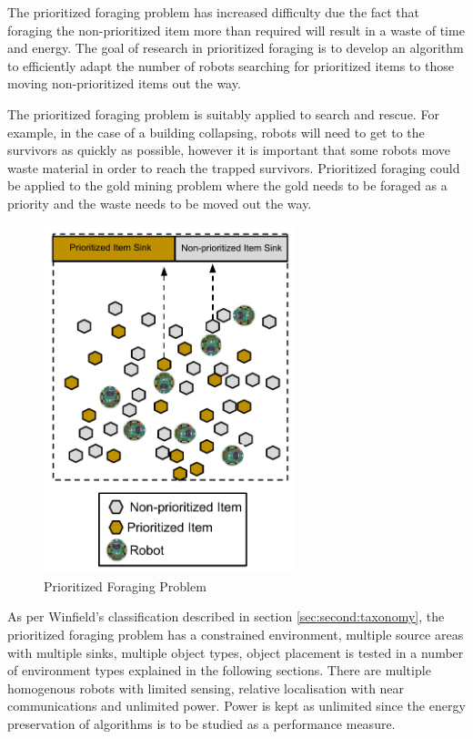 The prioritized foraging problem has increased difficulty due the fact that  foraging the non-prioritized item more than required will result in a waste of time and energy. The goal of research in prioritized foraging is to develop an algorithm to efficiently adapt the number of robots searching for prioritized items to those moving non-prioritized items out the way. 

The prioritized foraging problem is suitably applied to search and rescue. For example, in the case of a building collapsing, robots will need to get to the survivors as quickly as possible, however it is important that some robots move waste material in order to reach the trapped survivors. Prioritized foraging could be applied to the gold mining problem where the gold needs to be foraged as a priority and the waste needs to be moved out the way.


\begin{figure} [h]
	\centering
	\includegraphics[width=0.65\textwidth]{chapters/chapter2/figures/EpuckGoldMining.pdf}
	\caption{Prioritized Foraging Problem }
	\label{prioritizedforaging}
\end{figure}

As per Winfield's classification described in section \ref{sec:second:taxonomy}, the prioritized foraging problem has a constrained environment, multiple source areas with multiple sinks, multiple object types, object placement is tested in a number of environment types explained in the following sections. There are multiple homogenous robots with limited sensing, relative localisation with near communications and unlimited power. Power is kept as unlimited since the energy preservation of algorithms is to be studied as a performance measure. 

